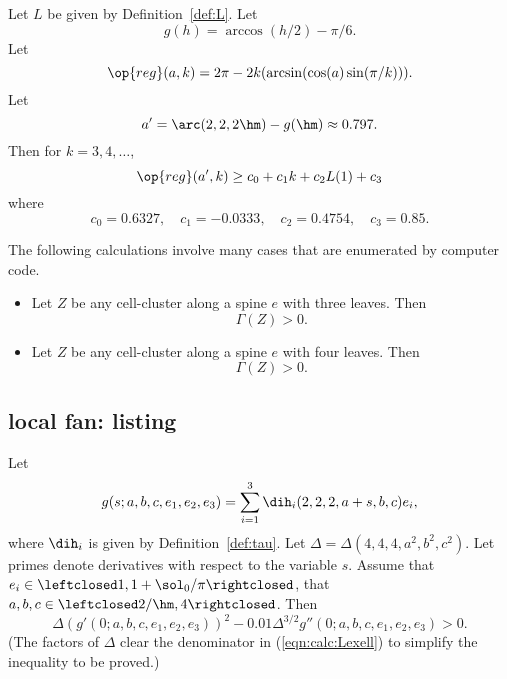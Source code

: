 \begin{calculation}\label{calc:cc:alin2}
Let $L$ be given by Definition~\ref{def:L}.
Let
\begin{displaymath}
g(h) = \arccos(h/2) - \pi/6.
\end{displaymath}
Let
\begin{displaymath}
\op{reg}(a,k) = 2\pi - 2 k (\arcsin(\cos(a)\sin(\pi/k))).
\end{displaymath}
Let
\begin{displaymath}a'=\arc(2,2,2\hm)-g(\hm) \approx
0.797.\end{displaymath} Then for $k=3,4,\ldots$,
\begin{displaymath}\op{reg}(a',k) \ge c_0 + c_1 k + c_2 L(1) +
c_3\end{displaymath}
where 
\begin{displaymath}c_0 = 0.6327,\quad c_1 = -0.0333,\quad c_2 =
0.4754,\quad c_3 = 0.85.\end{displaymath}
\end{calculation}

\begin{calculation}\label{calc:shorts}
The following calculations involve many cases that are enumerated by
computer code.
\begin{itemize}
\item {} Let $Z$ be any cell-cluster along a spine $e$
with three leaves.  Then
\begin{displaymath}
\Gamma(Z)> 0.
\end{displaymath}
\item {} Let $Z$ be any cell-cluster along a spine $e$
with four leaves.  Then
\begin{displaymath}
\Gamma(Z)> 0.
\end{displaymath}
\end{itemize}
\end{calculation}




\subsection{local fan: listing}

\begin{calculation}\label{calc:Lexell}
Let
\begin{displaymath}
g(s;a,b,c,e_1,e_2,e_3) = \sum_{i=1}^3 \dih_i(2,2,2,a+s,b,c) e_i,
\end{displaymath}
where $\dih_i$ is given by Definition~\ref{def:tau}.
Let $\Delta = \Delta(4,4,4,a^2,b^2,c^2)$.
Let primes denote derivatives with respect to the variable $s$.
Assume that
$e_i\in\leftclosed1,1+\sol_0/\pi\rightclosed$,  that
$a,b,c\in\leftclosed2/\hm,4\rightclosed$.
Then
\begin{equation}\label{eqn:calc:Lexell}
  \Delta (g'(0;a,b,c,e_1,e_2,e_3))^2 
- 0.01\Delta^{3/2}g''(0;a,b,c,e_1,e_2,e_3) > 0.
\end{equation}
(The factors of $\Delta$ clear the denominator in
(\ref{eqn:calc:Lexell}) to simplify the inequality to be proved.)
\end{calculation}

